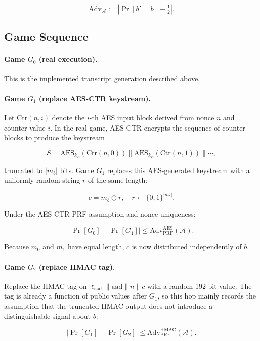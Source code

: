 \[
\mathrm{Adv}_{\mathcal{A}} :=
\left| \Pr[b' = b] - \tfrac{1}{2} \right|.
\]

\subsection{Game Sequence}

\paragraph{Game \(G_0\) (real execution).}
This is the implemented transcript generation described above.

\paragraph{Game \(G_1\) (replace AES-CTR keystream).}
Let \(\mathrm{Ctr}(n,i)\) denote the \(i\)-th AES input block derived from nonce
\(n\) and counter value \(i\). In the real game, AES-CTR encrypts the sequence of
counter blocks to produce the keystream

\[
S = \mathrm{AES}_{k_E}(\mathrm{Ctr}(n,0)) \parallel
\mathrm{AES}_{k_E}(\mathrm{Ctr}(n,1)) \parallel \cdots,
\]

truncated to \(|m_b|\) bits. Game \(G_1\) replaces this AES-generated keystream
with a uniformly random string \(r\) of the same length:

\[
c = m_b \oplus r, \quad r \leftarrow \{0,1\}^{|m_b|}.
\]

Under the AES-CTR PRF assumption and nonce uniqueness:

\[
|\Pr[G_0] - \Pr[G_1]| \leq
\mathrm{Adv}_{\mathrm{PRF}}^{\mathrm{AES}}(\mathcal{A}).
\]

Because \(m_0\) and \(m_1\) have equal length, \(c\) is now distributed
independently of \(b\).

\paragraph{Game \(G_2\) (replace HMAC tag).}
Replace the HMAC tag on
\(\ell_{\mathrm{aad}} \parallel \mathrm{aad} \parallel n \parallel c\) with a
random 192-bit value. The tag is already a function of public values after
\(G_1\), so this hop mainly records the assumption that the truncated HMAC output
does not introduce a distinguishable signal about \(b\):

\[
|\Pr[G_1] - \Pr[G_2]| \leq
\mathrm{Adv}_{\mathrm{PRF}}^{\mathrm{HMAC}}(\mathcal{A}).
\]

